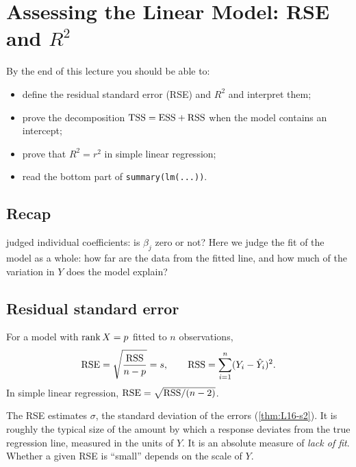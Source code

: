 \section{Assessing the Linear Model: RSE and $R^2$}\label{sec:L17}


\begin{guiding*}
By the end of this lecture you should be able to:
\begin{itemize}
  \item define the residual standard error (RSE) and $R^2$ and interpret them;
  \item prove the decomposition $\mathrm{TSS}=\mathrm{ESS}+\mathrm{RSS}$ when the model contains an intercept;
  \item prove that $R^2=r^2$ in simple linear regression;
  \item read the bottom part of \texttt{summary(lm(...))}.
\end{itemize}
\end{guiding*}

\subsection{Recap}
 judged individual coefficients: is $\beta_j$ zero or not? Here we judge the fit of the model as a
whole: how far are the data from the fitted line, and how much of the variation in $Y$ does the model explain?

\subsection{Residual standard error}
\begin{definition}\label{def:L17-rse}
For a model with $\operatorname{rank} X=p$ fitted to $n$ observations,
\[
\mathrm{RSE}=\sqrt{\frac{\mathrm{RSS}}{n-p}}=s,\qquad \mathrm{RSS}=\sum_{i=1}^n(Y_i-\hat Y_i)^2 .
\]
In simple linear regression, $\mathrm{RSE}=\sqrt{\mathrm{RSS}/(n-2)}$.
\end{definition}
The RSE estimates $\sigma$, the standard deviation of the errors (\cref{thm:L16-s2}). It is roughly the
typical size of the amount by which a response deviates from the true regression line, measured in the
units of $Y$. It is an absolute measure of \emph{lack of fit}. Whether a given RSE is ``small'' depends on
the scale of $Y$.

